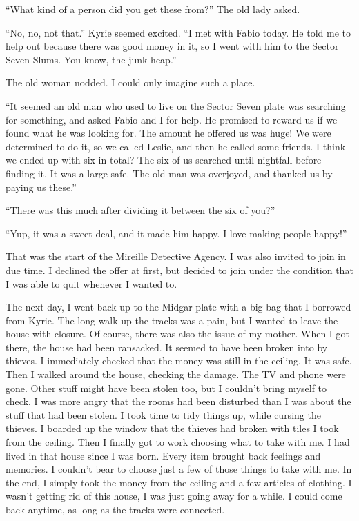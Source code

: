 \documentclass[oneside]{book}
\begin{document}
“What kind of a person did you get these from?” The old lady asked.

“No, no, not that.” Kyrie seemed excited. “I met with Fabio today. He told me to help out because there was good money in it, so I went with him to the Sector Seven Slums. You know, the junk heap.”

The old woman nodded. I could only imagine such a place.

“It seemed an old man who used to live on the Sector Seven plate was searching for something, and asked Fabio and I for help. He promised to reward us if we found what he was looking for. The amount he offered us was huge! We were determined to do it, so we called Leslie, and then he called some friends. I think we ended up with six in total? The six of us searched until nightfall before finding it. It was a large safe. The old man was overjoyed, and thanked us by paying us these.”

“There was this much after dividing it between the six of you?”

“Yup, it was a sweet deal, and it made him happy. I love making people happy!”

That was the start of the Mireille Detective Agency. I was also invited to join in due time. I declined the offer at first, but decided to join under the condition that I was able to quit whenever I wanted to.

The next day, I went back up to the Midgar plate with a big bag that I borrowed from Kyrie. The long walk up the tracks was a pain, but I wanted to leave the house with closure. Of course, there was also the issue of my mother. When I got there, the house had been ransacked. It seemed to have been broken into by thieves. I immediately checked that the money was still in the ceiling. It was safe. Then I walked around the house, checking the damage. The TV and phone were gone. Other stuff might have been stolen too, but I couldn’t bring myself to check. I was more angry that the rooms had been disturbed than I was about the stuff that had been stolen. I took time to tidy things up, while cursing the thieves. I boarded up the window that the thieves had broken with tiles I took from the ceiling. Then I finally got to work choosing what to take with me. I had lived in that house since I was born. Every item brought back feelings and memories. I couldn’t bear to choose just a few of those things to take with me. In the end, I simply took the money from the ceiling and a few articles of clothing. I wasn’t getting rid of this house, I was just going away for a while. I could come back anytime, as long as the tracks were connected.
\end{document}
